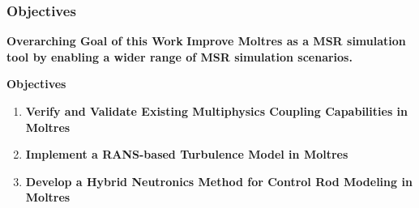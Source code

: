 \begin{frame}
  \frametitle{Objectives}
  \begin{block}{\textbf{Overarching Goal of this Work}}
    \textbf{Improve Moltres as a MSR simulation tool by enabling a wider range of MSR simulation
    scenarios.}
  \end{block}
  \begin{block}{\textbf{Objectives}}
    \begin{enumerate}
      \item \textbf{Verify and Validate Existing Multiphysics Coupling Capabilities in Moltres}
      \item \textbf{Implement a RANS-based Turbulence Model in Moltres}
      \item \textbf{Develop a Hybrid Neutronics Method for Control Rod Modeling in Moltres}
    \end{enumerate}
  \end{block}
\end{frame}
